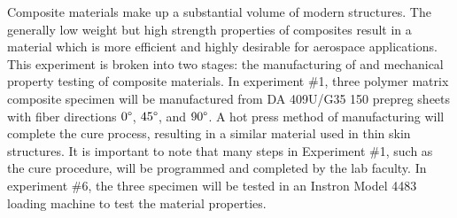 Composite materials make up a substantial volume of modern structures.  The generally low weight but high strength properties of composites result in a material which is more efficient and highly desirable for aerospace applications.  This experiment is broken into two stages: the manufacturing of and mechanical property testing of composite materials.  In experiment \#1, three polymer matrix composite specimen will be manufactured from DA 409U/G35 150 prepreg sheets with fiber directions $0\degree$, $45\degree$, and $90\degree$.  A hot press method of manufacturing will complete the cure process, resulting in a similar material used in thin skin structures.  It is important to note that many steps in Experiment \#1, such as the cure procedure, will be programmed and completed by the lab faculty.  In experiment \#6, the three specimen will be tested in an Instron Model 4483 loading machine to test the material properties.